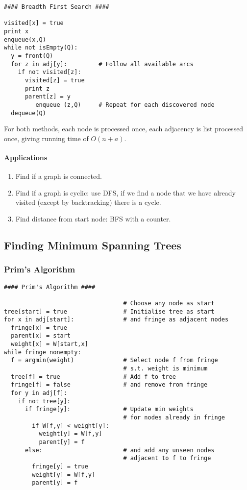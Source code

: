 \documentclass[twocolumn,english]{article}
\begin{document}
\begin{lstlisting}[basicstyle={\footnotesize\ttfamily}]
#### Breadth First Search ####

visited[x] = true
print x
enqueue(x,Q)
while not isEmpty(Q):
  y = front(Q)
  for z in adj[y]:         # Follow all available arcs
    if not visited[z]:
      visited[z] = true
      print z
      parent[z] = y
         enqueue (z,Q)     # Repeat for each discovered node
  dequeue(Q)
\end{lstlisting}


For both methods, each node is processed once, each adjacency is list
processed once, giving running time of $O\left(n+a\right)$.


\paragraph{Applications}
\begin{enumerate}
\item Find if a graph is connected.
\item Find if a graph is cyclic: use DFS, if we find a node that we have
already visited (except by backtracking) there is a cycle.
\item Find distance from start node: BFS with a counter.
\end{enumerate}

\subsection{Finding Minimum Spanning Trees}


\subsubsection{Prim's Algorithm}

\begin{lstlisting}[basicstyle={\footnotesize\ttfamily}]
#### Prim's Algorithm ####

                                  # Choose any node as start
tree[start] = true                # Initialise tree as start
for x in adj[start]:              # and fringe as adjacent nodes
  fringe[x] = true
  parent[x] = start
  weight[x] = W[start,x]
while fringe nonempty:
  f = argmin(weight)              # Select node f from fringe 
                                  # s.t. weight is minimum
  tree[f] = true                  # Add f to tree
  fringe[f] = false               # and remove from fringe
  for y in adj[f]:
    if not tree[y]:
      if fringe[y]:               # Update min weights
                                  # for nodes already in fringe
        if W[f,y] < weight[y]:
          weight[y] = W[f,y]
          parent[y] = f
      else:                       # and add any unseen nodes 
                                  # adjacent to f to fringe
        fringe[y] = true
        weight[y] = W[f,y]
        parent[y] = f
\end{lstlisting}
\end{document}
